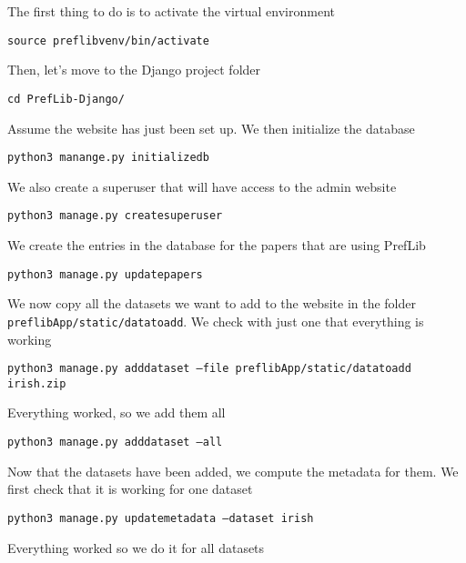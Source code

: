\documentclass{report}
\begin{document}
	The first thing to do is to activate the virtual environment
	
	\begin{center}
		\texttt{source preflibvenv/bin/activate}
	\end{center}

	Then, let's move to the Django project folder
	
	\begin{center}
		\texttt{cd PrefLib-Django/}
	\end{center}

	Assume the website has just been set up. We then initialize the database
	
	\begin{center}
		\texttt{python3 manange.py initializedb}
	\end{center}
	
	We also create a superuser that will have access to the admin website
	
	\begin{center}
		\texttt{python3 manage.py createsuperuser}
	\end{center}

	We create the entries in the database for the papers that are using PrefLib
	
	\begin{center}
		\texttt{python3 manage.py updatepapers}
	\end{center}

	We now copy all the datasets we want to add to the website in the folder \texttt{preflibApp/static/datatoadd}. We check with just one that everything is working
	
	\begin{center}
		\texttt{python3 manage.py adddataset --file preflibApp/static/datatoadd irish.zip}
	\end{center}
	
	Everything worked, so we add them all
	
	\begin{center}
		\texttt{python3 manage.py adddataset --all}
	\end{center}

	Now that the datasets have been added, we compute the metadata for them. We first check that it is working for one dataset
	
	\begin{center}
		\texttt{python3 manage.py updatemetadata --dataset irish}
	\end{center}

	Everything worked so we do it for all datasets
	
\end{document}
